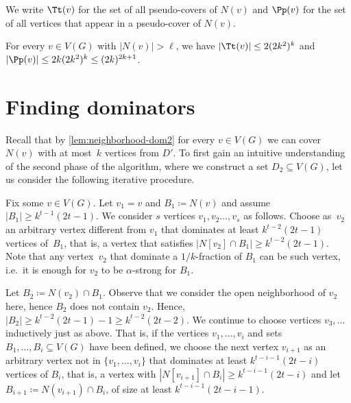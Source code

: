 
\begin{tcolorbox}
We write $\Tt(v)$ for the set of all pseudo-covers
of $N(v)$ and $\Pp(v)$ for the set of all vertices that appear in a
pseudo-cover of $N(v)$.
\end{tcolorbox}



\begin{corollary}\label{cor:nb-dominators}
For every $v\in V(G)$ with $|N(v)|> \ell$, we have
  $|\Tt(v)|\le 2(2k^2)^k$ and $|\Pp(v)|\le 2k(2k^2)^k\le (2k)^{2k+1}$.
\end{corollary}


\section{Finding dominators}


Recall that by \cref{lem:neighborhood-dom2} for every $v\in V(G)$ we can
cover $N(v)$ with at most~$k$ vertices from $D'$.
To first gain an intuitive understanding of the second phase of the
algorithm, where we construct a set $D_2\subseteq V(G)$, let us consider the
following iterative procedure.

Fix some $v\in V(G)$. Let $v_1=v$ and $B_1\coloneqq N(v)$
and assume $|B_1|\geq k^{t-1}(2t{-}1)$. We consider $s$
vertices $v_1,v_2\ldots, v_s$ as follows.
Choose as~$v_2$ an arbitrary vertex different from $v_1$
that dominates at least $k^{t-2}(2t-1)$ vertices of~$B_1$, that is,
a vertex that satisfies $|N[v_2]\cap B_1|\geq k^{t-2}(2t-1)$.
Note that any vertex~$v_2$ that dominate a $1/k$-fraction of $B_1$ can
be such vertex, i.e.~it is enough for $v_2$ to be $\alpha$-strong for $B_1$.

Let $B_2\coloneqq N(v_2)\cap B_1$. Observe that we consider
the open neighborhood of $v_2$ here, hence $B_2$ does
not contain $v_2$. Hence, $|B_2|\geq k^{t-2}(2t-1)-1\geq
k^{t-2}(2t-2)$.
We continue to choose vertices $v_3,\ldots$ inductively
just as above. That is, if the vertices $v_1,\ldots,v_i$ and sets
$B_1,\ldots, B_i\subseteq V(G)$ have been defined, we choose
the next vertex $v_{i+1}$ as an arbitrary vertex not in $\{v_1,\ldots,
v_i\}$ that dominates
at least $k^{t-i-1}(2t-i)$ vertices of $B_i$, that is, a vertex with
$|N[v_{i+1}]\cap B_i| \ge k^{t-i-1}(2t-i)$ and let
$B_{i+1}\coloneqq N(v_{i+1})\cap B_i$, of size at least
$k^{t-i-1}(2t-i-1)$.



